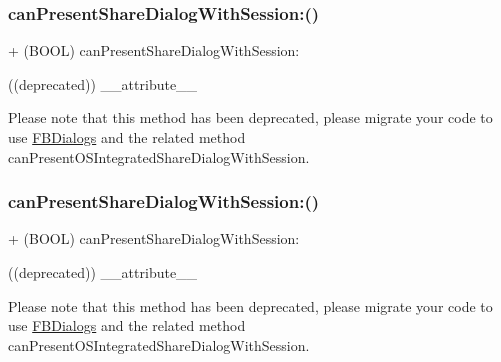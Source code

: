 \subsubsection{\texorpdfstring{can\+Present\+Share\+Dialog\+With\+Session\+:()}{canPresentShareDialogWithSession:()}\hspace{0.1cm}{\footnotesize\ttfamily [1/5]}}
{\footnotesize\ttfamily + (B\+O\+OL) can\+Present\+Share\+Dialog\+With\+Session\+: \begin{DoxyParamCaption}\item[{((deprecated))}]{\+\_\+\+\_\+attribute\+\_\+\+\_\+ }\end{DoxyParamCaption}}

Please note that this method has been deprecated, please migrate your code to use {\ttfamily \hyperlink{interfaceFBDialogs}{F\+B\+Dialogs}} and the related method {\ttfamily can\+Present\+O\+S\+Integrated\+Share\+Dialog\+With\+Session}. \mbox{\label{interfaceFBNativeDialogs_a8b8d5049303db38cf3f214e0367ea424}} 
\subsubsection{\texorpdfstring{can\+Present\+Share\+Dialog\+With\+Session\+:()}{canPresentShareDialogWithSession:()}\hspace{0.1cm}{\footnotesize\ttfamily [2/5]}}
{\footnotesize\ttfamily + (B\+O\+OL) can\+Present\+Share\+Dialog\+With\+Session\+: \begin{DoxyParamCaption}\item[{((deprecated))}]{\+\_\+\+\_\+attribute\+\_\+\+\_\+ }\end{DoxyParamCaption}}

Please note that this method has been deprecated, please migrate your code to use {\ttfamily \hyperlink{interfaceFBDialogs}{F\+B\+Dialogs}} and the related method {\ttfamily can\+Present\+O\+S\+Integrated\+Share\+Dialog\+With\+Session}. \mbox{\label{interfaceFBNativeDialogs_a8b8d5049303db38cf3f214e0367ea424}} 
